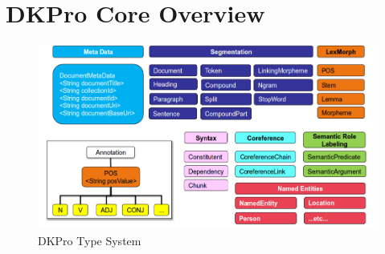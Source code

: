 \chapter{DKPro Core Overview}
\begin{figure}[ht]
    \centering
    \includegraphics[width=1\textwidth]{fig/dkpro-overview.png}
    \caption[Short caption]{DKPro Type System}
    \label{fig:dkpro-overview}
\end{figure}
\label{sec:dkpro overview}